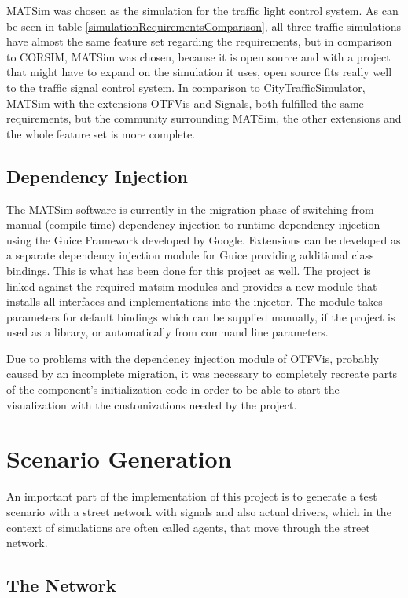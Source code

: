 MATSim was chosen as the simulation for the traffic light control system. As can be seen in table \ref{simulationRequirementsComparison}, all three traffic simulations have almost the same feature set regarding the requirements, but in comparison to CORSIM, MATSim was chosen, because it is open source and with a project that might have to expand on the simulation it uses, open source fits really well to the traffic signal control system. In comparison to CityTrafficSimulator, MATSim with the extensions OTFVis and Signals, both fulfilled the same requirements, but the community surrounding MATSim, the other extensions and the whole feature set is more complete.

\subsection*{Dependency Injection}

The MATSim software is currently in the migration phase of switching from manual (compile-time) dependency injection to runtime dependency injection using the Guice Framework developed by Google. Extensions can be developed as a separate dependency injection module for Guice providing additional class bindings. This is what has been done for this project as well. The project is linked against the required matsim modules and provides a new module that installs all interfaces and implementations into the injector. The module takes parameters for default bindings which can be supplied manually, if the project is used as a library, or automatically from command line parameters.

Due to problems with the dependency injection module of OTFVis, probably caused by an incomplete migration, it was necessary to completely recreate parts of the component's initialization code in order to be able to start the visualization with the customizations needed by the project.

\section{Scenario Generation}
\label{scenario_generation}

An important part of the implementation of this project is to generate a test scenario with a street network with signals and also actual drivers, which in the context of simulations are often called agents, that move through the street network.

\subsection*{The Network}

